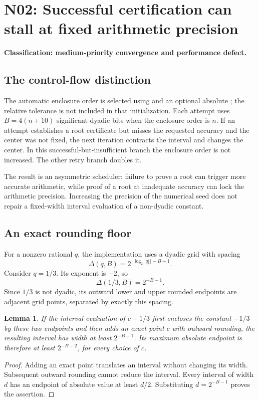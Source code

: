 \documentclass[11pt,a4paper]{article}
\newcommand{\code}[1]{\texttt{\detokenize{#1}}}
\newcommand{\finding}[3]{\Needspace{7\baselineskip}\section{#1: #2}\textbf{Classification: #3.}\par}
\newtheorem{lemma}[proposition]{Lemma}
\begin{document}
\finding{N02}{Successful certification can stall at fixed arithmetic precision}{medium-priority convergence and performance defect}
\label{sec:n02}

\subsection{The control-flow distinction}
The automatic enclosure order is selected using \code{WorkingPrecision} and an optional absolute \code{TargetError}; the relative tolerance is not included in that initialization. Each attempt uses \(B=4(n+10)\) significant dyadic bits when the enclosure order is \(n\). If an attempt establishes a root certificate but misses the requested accuracy and the center was not fixed, the next iteration contracts the interval and changes the center. In this successful-but-insufficient branch the enclosure order is not increased. The other retry branch doubles it.\cite{cert}

The result is an asymmetric scheduler: failure to prove a root can trigger more accurate arithmetic, while proof of a root at inadequate accuracy can lock the arithmetic precision. Increasing the precision of the numerical seed does not repair a fixed-width interval evaluation of a non-dyadic constant.

\subsection{An exact rounding floor}
For a nonzero rational \(q\), the implementation uses a dyadic grid with spacing
\begin{equation}
 \Delta(q,B)=2^{\lfloor\log_2|q|\rfloor-B+1}.
 \label{eq:grid}
\end{equation}
Consider \(q=1/3\). Its exponent is \(-2\), so
\[
 \Delta(1/3,B)=2^{-B-1}.
\]
Since \(1/3\) is not dyadic, its outward lower and upper rounded endpoints are adjacent grid points, separated by exactly this spacing.

\begin{lemma}
If the interval evaluation of \(c-1/3\) first encloses the constant \(-1/3\) by these two endpoints and then adds an exact point \(c\) with outward rounding, the resulting interval has width at least \(2^{-B-1}\). Its maximum absolute endpoint is therefore at least \(2^{-B-2}\), for every choice of \(c\).
\end{lemma}
\begin{proof}
Adding an exact point translates an interval without changing its width. Subsequent outward rounding cannot reduce the interval. Every interval of width \(d\) has an endpoint of absolute value at least \(d/2\). Substituting \(d=2^{-B-1}\) proves the assertion.
\end{proof}
\end{document}
